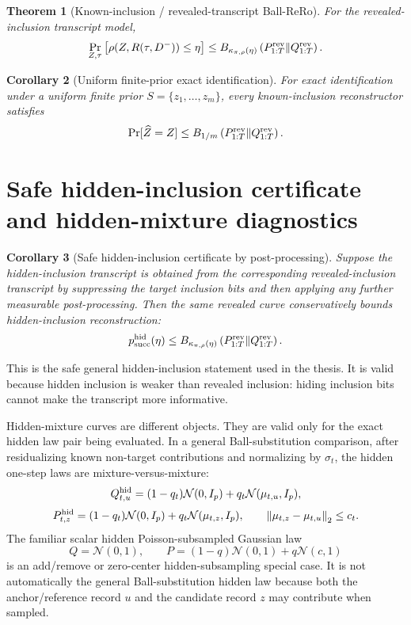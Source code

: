 \documentclass[11pt,a4paper]{report}
\theoremstyle{plain}
\newtheorem{theorem}{Theorem}[chapter]
\newtheorem{corollary}[theorem]{Corollary}
\theoremstyle{definition}
\theoremstyle{remark}
\newcommand{\N}{\mathcal{N}}
\newcommand{\norm}[1]{\left\lVert #1\right\rVert}
\begin{document}
\begin{theorem}[Known-inclusion / revealed-transcript Ball-ReRo]
\label{thm:known-inclusion-rero}
For the revealed-inclusion transcript model,
\[
\Pr_{Z,\tau}\big[\rho(Z,R(\tau,D^-))\le\eta\big]
\le
B_{\kappa_{\pi,\rho}(\eta)}
\left(P_{1:T}^{\rm rev}\middle\|Q_{1:T}^{\rm rev}\right).
\]
\end{theorem}

\begin{corollary}[Uniform finite-prior exact identification]
\label{cor:transcript-uniform-finite}
For exact identification under a uniform finite prior $S=\{z_1,\ldots,z_m\}$, every known-inclusion reconstructor satisfies
\[
\Pr[\widehat Z=Z]
\le
B_{1/m}\left(P_{1:T}^{\rm rev}\middle\|Q_{1:T}^{\rm rev}\right).
\]
\end{corollary}

\section{Safe hidden-inclusion certificate and hidden-mixture diagnostics}
\label{sec:hidden-inclusion-transcript}

\begin{corollary}[Safe hidden-inclusion certificate by post-processing]
\label{cor:hidden-safe-by-revealed}
Suppose the hidden-inclusion transcript is obtained from the corresponding revealed-inclusion transcript by suppressing the target inclusion bits and then applying any further measurable post-processing.  Then the same revealed curve conservatively bounds hidden-inclusion reconstruction:
\[
p_{\rm succ}^{\rm hid}(\eta)
\le
B_{\kappa_{\pi,\rho}(\eta)}
\left(P_{1:T}^{\rm rev}\middle\|Q_{1:T}^{\rm rev}\right).
\]
\end{corollary}

This is the safe general hidden-inclusion statement used in the thesis.  It is valid because hidden inclusion is weaker than revealed inclusion: hiding inclusion bits cannot make the transcript more informative.

Hidden-mixture curves are different objects.  They are valid only for the exact hidden law pair being evaluated.  In a general Ball-substitution comparison, after residualizing known non-target contributions and normalizing by $\sigma_t$, the hidden one-step laws are mixture-versus-mixture:
\[
Q_{t,u}^{\rm hid}
=(1-q_t)\N(0,I_p)+q_t\N(\mu_{t,u},I_p),
\]
\[
P_{t,z}^{\rm hid}
=(1-q_t)\N(0,I_p)+q_t\N(\mu_{t,z},I_p),
\qquad
\norm{\mu_{t,z}-\mu_{t,u}}_2\le c_t.
\]
The familiar scalar hidden Poisson-subsampled Gaussian law
\[
Q=\N(0,1),
\qquad
P=(1-q)\N(0,1)+q\N(c,1)
\]
is an add/remove or zero-center hidden-subsampling special case.  It is not automatically the general Ball-substitution hidden law because both the anchor/reference record $u$ and the candidate record $z$ may contribute when sampled.
\end{document}
